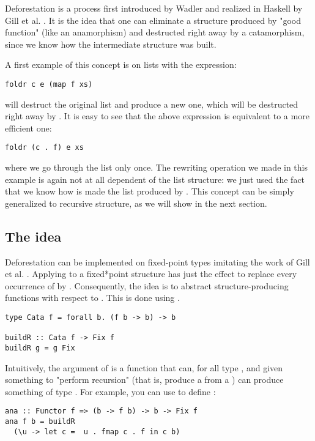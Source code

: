 
Deforestation is a process first introduced by Wadler \cite{WADLER1990231} and realized in Haskell by Gill et al. \cite{Gill:1993:SCD:165180.165214}. It is the idea that one can eliminate a structure produced by "good function" (like an anamorphism) and destructed right away by a catamorphism, since we know how the intermediate structure was built.

A first example of this concept is on lists with the expression:
\begin{verbatim}
foldr c e (map f xs)
\end{verbatim}
 will destruct the original list and produce a new one, which will be destructed right away by . It is easy to see that the above expression is equivalent to a more efficient one:
\begin{verbatim}
foldr (c . f) e xs
\end{verbatim}
\noindent where we go through the list only once.
The rewriting operation we made in this example is again not at all dependent of the list structure: we just used the fact that we know how is made the list produced by . This concept can be simply generalized to recursive structure, as we will show in the next section.

\subsection{The idea}
Deforestation can be implemented on fixed-point types imitating the work of Gill et al. \cite{Gill:1993:SCD:165180.165214}. Applying  to a fixed*point structure has just the effect to replace every occurrence of  by . Consequently, the idea is to abstract structure-producing functions with respect to . This is done using .

\begin{verbatim}
type Cata f = forall b. (f b -> b) -> b

buildR :: Cata f -> Fix f
buildR g = g Fix
\end{verbatim}

\noindent Intuitively, the argument of  is a function that can, for all type , and given something to "perform recursion" (that is, produce a  from a ) can produce something of type . For example, you can use  to define :
\begin{verbatim}
ana :: Functor f => (b -> f b) -> b -> Fix f
ana f b = buildR
  (\u -> let c =  u . fmap c . f in c b)
\end{verbatim}

